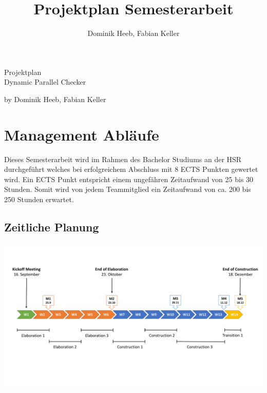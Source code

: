 \documentclass[10pt,a4paper]{article}
\author{Dominik Heeb, Fabian Keller}
\title{Projektplan Semesterarbeit}
\begin{document}
\begin{titlepage}
	\begin{Huge}
		\begin{center}
				Projektplan \\Dynamic Parallel Checker\\[2.0cm]
		\end{center}
	\end{Huge}
	
	\begin{Large}
		\begin{center}
				by Dominik Heeb, Fabian Keller		
		\end{center}
	\end{Large}
\end{titlepage}

\newpage
\tableofcontents 
\newpage

\section{Management Abläufe}
\begin{flushleft}
	Dieses Semesterarbeit wird im Rahmen des Bachelor Studiums an der HSR durchgeführt welches bei erfolgreichem Abschluss mit 8 ECTS Punkten gewertet wird. Ein ECTS Punkt entspricht einem ungefähren Zeitaufwand von 25 bis 30 Stunden. Somit wird von jedem Teammitglied ein Zeitaufwand von ca. 200 bis 250 Stunden erwartet.
\end{flushleft}

\subsection{Zeitliche Planung}
	\begin{flushleft}
		
	\end{flushleft}
	\includegraphics[width=16cm,height=7.5cm,trim=10mm 40mm 0mm 20mm, clip]{pictures/Meilensteinplan.pdf}
\end{document}
